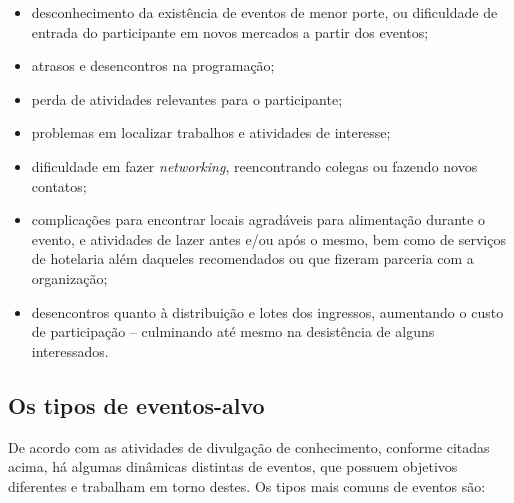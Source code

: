 \documentclass[12pt,a4paper,twoside,hyphens,english,brazil]{abntex2}
\begin{document}
\begin{itemize}[itemsep=-1ex]
	\item desconhecimento da existência de eventos de menor porte, ou dificuldade de entrada do participante em novos mercados a partir dos eventos;
	\item atrasos e desencontros na programação;
	\item perda de atividades relevantes para o participante;
	\item problemas em localizar trabalhos e atividades de interesse;
	\item dificuldade em fazer \emph{networking}, reencontrando colegas ou fazendo novos contatos;
	\item complicações para encontrar locais agradáveis para alimentação durante o evento, e atividades de lazer antes e/ou após o mesmo, bem como de serviços de hotelaria além daqueles recomendados ou que fizeram parceria com a organização;
	\item desencontros quanto à distribuição e lotes dos ingressos, aumentando o custo de participação -- culminando até mesmo na desistência de alguns interessados.
\end{itemize}

\subsection{Os tipos de eventos-alvo} \label{sec:eventos}
De acordo com as atividades de divulgação de conhecimento, conforme citadas acima, há algumas dinâmicas distintas de eventos, que possuem objetivos diferentes e trabalham em torno destes. Os tipos mais comuns de eventos são\cite{tipos-manager}\cite{tipos-parlante}\cite{dicionario}\cite{dicas-feira-de-negocios}:
\end{document}
